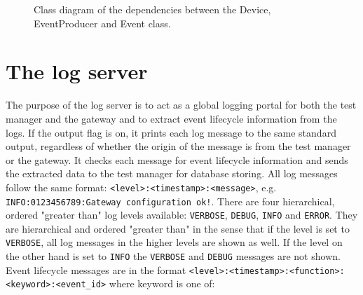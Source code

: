 \begin{figure}[h!]
    \centering

    \caption[Class diagram of name service components.]{Class diagram of the
    dependencies between the Device, EventProducer and Event class.}

    \label{fig:device_class_diagram}
\end{figure}

\section{The log server}
\label{sec:log_server}

The purpose of the log server is to act as a global logging portal for both the
test manager and the gateway and to extract event lifecycle information from
the logs. If the output flag is on, it prints each log message to the same
standard output, regardless of whether the origin of the message is from the
test manager or the gateway. It checks each message for event lifecycle
information and sends the extracted data to the test manager for database
storing. All log messages follow the same format:
\texttt{<level>:<timestamp>:<message>}, e.g. \texttt{INFO:0123456789:Gateway
configuration ok!}. There are four hierarchical, ordered "greater than" log
levels available: \texttt{VERBOSE}, \texttt{DEBUG}, \texttt{INFO} and
\texttt{ERROR}. They are hierarchical and ordered "greater than" in the sense
that if the level is set to \texttt{VERBOSE}, all log messages in the higher
levels are shown as well. If the level on the other hand is set to
\texttt{INFO} the \texttt{VERBOSE} and \texttt{DEBUG} messages are not shown.
Event lifecycle messages are in the format
\texttt{<level>:<timestamp>:<function>:<keyword>:<event\_id>} where keyword is
one of:

